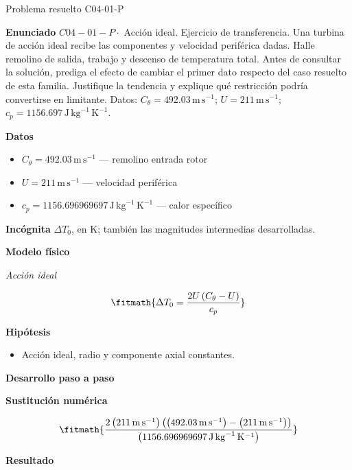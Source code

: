 \documentclass[10pt,openany]{book}
\begin{document}
\begin{studiumworked}{Problema resuelto C04-01-P}


\noindent\textbf{Enunciado}
\(C04-01-P \cdot\) Acción ideal. Ejercicio de transferencia. Una turbina de acción ideal recibe las componentes y velocidad periférica dadas. Halle remolino de salida, trabajo y descenso de temperatura total. Antes de consultar la solución, prediga el efecto de cambiar el primer dato respecto del caso resuelto de esta familia. Justifique la tendencia y explique qué restricción podría convertirse en limitante. Datos: \(C_\theta=492.03\, \mathrm{m}\,\mathrm{s}^{-1}\); \(U=211\, \mathrm{m}\,\mathrm{s}^{-1}\); \(c_p=1156.697\, \mathrm{J}\,\mathrm{kg}^{-1}\,\mathrm{K}^{-1}\).

\noindent\textbf{Datos}
\begin{itemize}
\item $C_\theta = 492.03\,\mathrm{m}\,\mathrm{s}^{-1}$ — remolino entrada rotor
\item $U = 211\,\mathrm{m}\,\mathrm{s}^{-1}$ — velocidad periférica
\item $c_p = 1156.696969697\,\mathrm{J}\,\mathrm{kg}^{-1}\,\mathrm{K}^{-1}$ — calor específico
\end{itemize}

\noindent\textbf{Incógnita}
$\Delta T_0$, en $\mathrm{K}$; también las magnitudes intermedias desarrolladas.

\noindent\textbf{Modelo físico}

\noindent\textit{Acción ideal}

\[
\fitmath{\Delta T_0=\frac{2 U \left(C_\theta - U\right)}{c_p}}
\]

\noindent\textbf{Hipótesis}
\begin{itemize}
\item Acción ideal, radio y componente axial constantes.
\end{itemize}

\noindent\textbf{Desarrollo paso a paso}



\noindent\textbf{Sustitución numérica}

\[
\fitmath{\frac{2 \left(211\,\mathrm{m}\,\mathrm{s}^{-1}\right) \left(\left(492.03\,\mathrm{m}\,\mathrm{s}^{-1}\right) - \left(211\,\mathrm{m}\,\mathrm{s}^{-1}\right)\right)}{\left(1156.696969697\,\mathrm{J}\,\mathrm{kg}^{-1}\,\mathrm{K}^{-1}\right)}}
\]

\noindent\textbf{Resultado}


\end{studiumworked}
\end{document}
